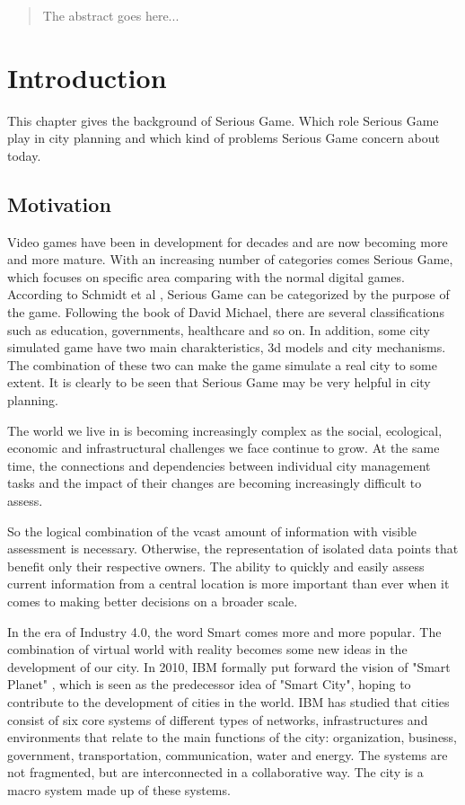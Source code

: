 \begin{abstract}
 The abstract goes here...
\end{abstract}




\chapter{Introduction}

This chapter gives the background of Serious Game. Which role Serious Game play in city planning and which kind of problems Serious Game concern about today.  

\section{Motivation}
Video games have been in development for decades and are now becoming more and more mature. With an increasing number of categories comes Serious Game, which focuses on specific area comparing with the normal digital games. According to Schmidt et al \cite{schmidt2015applied}, Serious Game can be categorized by the purpose of the game. Following the book of David Michael\cite{michael2005serious}, there are several classifications such as education, governments, healthcare and so on. In addition, some city simulated game have two main charakteristics, 3d models and city mechanisms. The combination of these two can make the game simulate a real city to some extent. It is clearly to be seen that Serious Game may be very helpful in city planning. 

The world we live in is becoming increasingly complex as the social, ecological, economic and infrastructural challenges we face continue to grow. At the same time, the connections and dependencies between individual city management tasks and the impact of their changes are becoming increasingly difficult to assess.

So the logical combination of the vcast amount of information with visible assessment is necessary. Otherwise, the representation of isolated data points that benefit only their respective owners. The ability to quickly and easily assess current information from a central location is more important than ever when it comes to making better decisions on a broader scale.


In the era of Industry 4.0, the word Smart comes more and more popular. The combination of virtual world with reality becomes some new ideas in the development of our city. In 2010, IBM formally put forward the vision of "Smart Planet" \cite{IBMSmartPlanet}, which is seen as the predecessor idea of "Smart City", hoping to contribute to the development of cities in the world. IBM has studied that cities consist of six core systems of different types of networks, infrastructures and environments that relate to the main functions of the city: organization, business, government, transportation, communication, water and energy. The systems are not fragmented, but are interconnected in a collaborative way. The city is a macro system made up of these systems.


